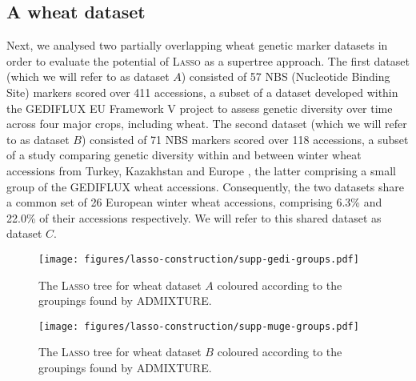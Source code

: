 \subsection{A wheat dataset}
\label{sec:wheat-dataset}

Next, we analysed two partially overlapping wheat genetic marker datasets in
order to evaluate the potential of \textsc{Lasso} as a supertree approach. The
first dataset (which we will refer to as dataset $A$) consisted of 57 NBS
(Nucleotide Binding Site) markers scored over 411 accessions, a subset of a
dataset developed within the GEDIFLUX EU Framework V project \cite{gediflux}
to assess genetic diversity over time across four major crops, including
wheat. The second dataset (which we will refer to as dataset $B$) consisted of
71 NBS markers scored over 118 accessions, a subset of a study comparing
genetic diversity within and between winter wheat accessions from Turkey,
Kazakhstan and Europe \cite{muge}, the latter comprising a small group of the
GEDIFLUX wheat accessions. Consequently, the two datasets share a common set
of 26 European winter wheat accessions, comprising 6.3\% and 22.0\% of their
accessions respectively. We will refer to this shared dataset as dataset $C$.

\begin{figure}[t]
  \centering
  \texttt{[image: figures/lasso-construction/supp-gedi-groups.pdf]}
  \caption{The \textsc{Lasso} tree for wheat dataset $A$ coloured according to
    the groupings found by ADMIXTURE.}
  \label{fig:lasso-wheat-a}
\end{figure}

\begin{figure}[t]
  \centering
  \texttt{[image: figures/lasso-construction/supp-muge-groups.pdf]}
  \caption{The \textsc{Lasso} tree for wheat dataset $B$ coloured according to
    the groupings found by ADMIXTURE.}
  \label{fig:lasso-wheat-b}
\end{figure} 

